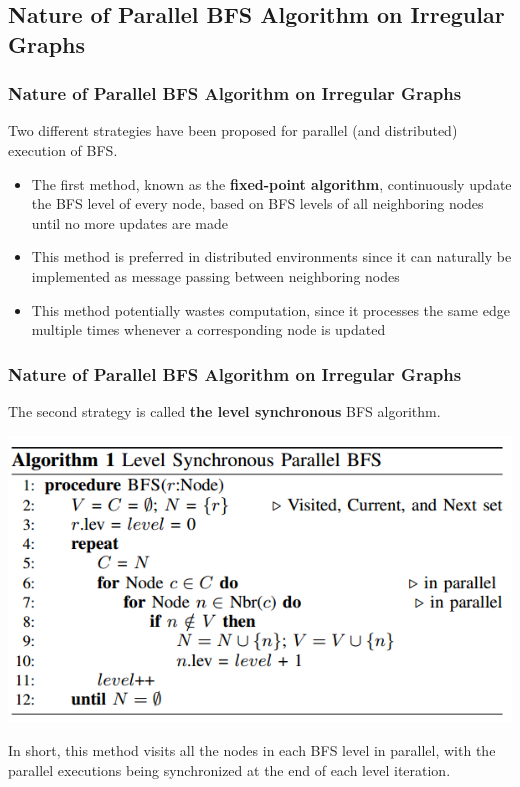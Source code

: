\documentclass{beamer}
\begin{document}
\begin{frame}
\section{Nature of Parallel BFS Algorithm on Irregular Graphs}
\frametitle{Nature of Parallel BFS Algorithm on Irregular Graphs}

Two different strategies have been proposed for parallel (and distributed) execution of BFS.

\begin{itemize}
\item The first method, known as the
\textbf{fixed-point algorithm}, continuously update the BFS level of every node, based on BFS levels of all neighboring nodes until no more updates are made
\item This method is preferred in distributed environments since it can naturally be implemented
as message passing between neighboring nodes
\item  This method potentially wastes computation,
since it processes the same edge multiple times whenever a corresponding node is updated
\end{itemize}

\end{frame}
\begin{frame}
\frametitle{Nature of Parallel BFS Algorithm on Irregular Graphs}
The second strategy is called \textbf{the level synchronous} BFS algorithm.

\includegraphics[scale=0.45]{algo.png}

In short, this method visits all the nodes in each BFS level
in parallel, with the parallel executions being synchronized at
the end of each level iteration.

\end{frame}
\end{document}
